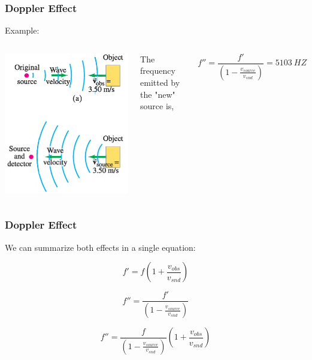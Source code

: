 \documentclass[]{beamer}
\begin{document}
\begin{frame}
\frametitle{Doppler Effect}

Example: 

\vspace{3mm}

   \begin{columns}[c]
   \column{2in}  %
  \begin{center}
  \includegraphics[height=2.in]{images4/doppler7.jpg}
\end{center}


  
   \column{2in}


The frequency emitted by the "new" source is,

\begin{equation*}
f''=\frac{f'}{(1-\frac{v_{source}}{v_{snd}})}=5103~HZ
\end{equation*}

   \end{columns}




  \end{frame}



\begin{frame}
\frametitle{Doppler Effect}

We can summarize both effects in a single equation:

\begin{equation*}
f'= f\left(1+\frac{v_{obs}}{v_{snd}}\right)
\end{equation*}


\begin{equation*}
f''=\frac{f'}{(1-\frac{v_{source}}{v_{snd}})}
\end{equation*}

\begin{equation}
f''= \frac{f}{(1-\frac{v_{source}}{v_{snd}})}\left(1+\frac{v_{obs}}{v_{snd}}\right)
\end{equation}


  \end{frame}
\end{document}

